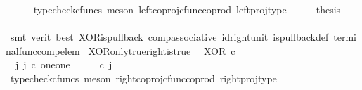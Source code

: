 \begin{isabellebody}
\ \ \ \ \isamarkupfalse%
\ {\isacharparenleft}{\kern0pt}typecheck{\isacharunderscore}{\kern0pt}cfuncs{\isacharcomma}{\kern0pt}\ meson\ left{\isacharunderscore}{\kern0pt}coproj{\isacharunderscore}{\kern0pt}cfunc{\isacharunderscore}{\kern0pt}coprod\ left{\isacharunderscore}{\kern0pt}proj{\isacharunderscore}{\kern0pt}type{\isacharparenright}{\kern0pt}\isanewline
\ \ \isamarkupfalse%
\ \isamarkupfalse%
\ {\isacharquery}{\kern0pt}thesis\isanewline
\ \ \ \ \isamarkupfalse%
\ {\isacharparenleft}{\kern0pt}smt\ {\isacharparenleft}{\kern0pt}verit{\isacharcomma}{\kern0pt}\ best{\isacharparenright}{\kern0pt}\ XOR{\isacharunderscore}{\kern0pt}is{\isacharunderscore}{\kern0pt}pullback\ comp{\isacharunderscore}{\kern0pt}associative{}\ id{\isacharunderscore}{\kern0pt}right{\isacharunderscore}{\kern0pt}unit{}\ is{\isacharunderscore}{\kern0pt}pullback{\isacharunderscore}{\kern0pt}def\ terminal{\isacharunderscore}{\kern0pt}func{\isacharunderscore}{\kern0pt}comp{\isacharunderscore}{\kern0pt}elem{\isacharparenright}{\kern0pt}\isanewline
{}\isamarkupfalse%
%
\endisatagproof
{\isafoldproof}%
%
\isadelimproof
\isanewline
%
\endisadelimproof
\isanewline
{}\isamarkupfalse%
\ XOR{\isacharunderscore}{\kern0pt}only{\isacharunderscore}{\kern0pt}true{\isacharunderscore}{\kern0pt}right{\isacharunderscore}{\kern0pt}is{\isacharunderscore}{\kern0pt}true{\isacharcolon}{\kern0pt}\isanewline
\ \ {\isachardoublequoteopen}XOR\ {\isasymcirc}\isactrlsub c\ \ {\isasymlangle}{\isasymf}{\isacharcomma}{\kern0pt}{\isasymt}{\isasymrangle}\ {\isacharequal}{\kern0pt}\ {\isasymt}{\isachardoublequoteclose}\isanewline
%
\isadelimproof
%
\endisadelimproof
%
\isatagproof
{}\isamarkupfalse%
\ {\isacharminus}{\kern0pt}\ \ \ \isanewline
\ \ \isamarkupfalse%
\ {\isachardoublequoteopen}{\isasymexists}\ j{\isachardot}{\kern0pt}\ j\ {\isasymin}\isactrlsub c\ one{\isasymCoprod}one\ {\isasymand}\ {\isacharparenleft}{\kern0pt}{\isasymlangle}{\isasymt}{\isacharcomma}{\kern0pt}\ {\isasymf}{\isasymrangle}\ {\isasymamalg}{\isasymlangle}{\isasymf}{\isacharcomma}{\kern0pt}\ {\isasymt}{\isasymrangle}{\isacharparenright}{\kern0pt}\ {\isasymcirc}\isactrlsub c\ j\ \ {\isacharequal}{\kern0pt}\ {\isasymlangle}{\isasymf}{\isacharcomma}{\kern0pt}{\isasymt}{\isasymrangle}{\isachardoublequoteclose}\isanewline
\ \ \ \ \isamarkupfalse%
\ {\isacharparenleft}{\kern0pt}typecheck{\isacharunderscore}{\kern0pt}cfuncs{\isacharcomma}{\kern0pt}\ meson\ right{\isacharunderscore}{\kern0pt}coproj{\isacharunderscore}{\kern0pt}cfunc{\isacharunderscore}{\kern0pt}coprod\ right{\isacharunderscore}{\kern0pt}proj{\isacharunderscore}{\kern0pt}type{\isacharparenright}{\kern0pt}\isanewline

\end{isabellebody}
